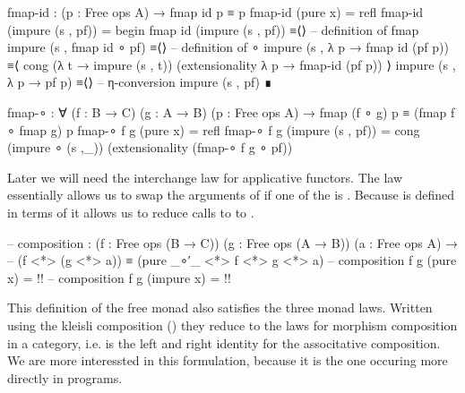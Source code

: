 \begin{code}[number=fmap-id]
fmap-id : (p : Free ops A) → fmap id p ≡ p
fmap-id (pure x)           = refl
fmap-id (impure (s , pf))  = begin
  fmap id (impure (s , pf))          ≡⟨⟩ -- definition of fmap
  impure (s , fmap id ∘ pf)          ≡⟨⟩ -- definition of ∘
  impure (s , λ p → fmap id (pf p))  ≡⟨ cong (λ t → impure (s , t))
                                         (extensionality λ p → fmap-id (pf p)) ⟩
  impure (s , λ p → pf p)            ≡⟨⟩ -- η-conversion
  impure (s , pf)                    ∎
\end{code}
\begin{code}[number=fmap-comp]
fmap-∘ : ∀ (f : B → C) (g : A → B) (p : Free ops A) →
  fmap (f ∘ g) p ≡ (fmap f ∘ fmap g) p
fmap-∘ f g (pure x)           = refl
fmap-∘ f g (impure (s , pf))  = cong (impure ∘ (s ,_)) (extensionality (fmap-∘ f g ∘ pf))
\end{code}
Later we will need the interchange law for applicative functors.
The law essentially allows us to swap the arguments of \AgdaFunction{<*>} if one
of the is .
Because \AgdaFunction{<*>} is defined in terms of \AgdaFunction{<\$>} it allows
us to reduce calls to \AgdaFunction{<*>} to \AgdaFunction{<\$>}.

\begin{code}[hide]
-- composition : (f : Free ops (B → C)) (g : Free ops (A → B)) (a : Free ops A) →
--    (f <*> (g <*> a)) ≡ (pure _∘′_ <*> f <*> g <*> a)
-- composition f g (pure x) = {!!}
-- composition f g (impure x) = {!!}
\end{code}
This definition of the free monad also satisfies the three monad laws.
Written using the kleisli composition (\AgdaFunction{>=>}) they reduce to the
laws for morphism composition in a category, i.e.
 is the left and right identity for the
associtative composition.
We are more interessted in this formulation, because it is the one occuring more
directly in programs.

